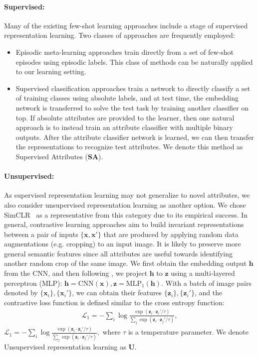 \paragraph{Supervised:} Many of the existing few-shot learning approaches
include a stage of supervised representation learning. Two classes of
approaches are frequently employed:
\iflatexml
\begin{itemize}
\else
\begin{itemize}[leftmargin=*]
\fi
\savespacebeforesection
\item Episodic meta-learning approaches train directly from a set of few-shot
episodes using episodic labels. This class of methods can be naturally applied
to our learning setting.
\item Supervised classification approaches train a network to directly classify
a set of training classes using absolute labels, and at test time, the
embedding network is transferred to solve the test task by training another
classifier on top. If absolute attributes are provided to the learner, then one
natural approach is to instead train an attribute classifier with multiple
binary outputs. After the attribute classifier network is learned, we can then
transfer the representations to recognize test attributes. We denote this
method as Supervised Attributes (\textbf{SA}).
\end{itemize}
\savespacebeforesection
\paragraph{Unsupervised:} 
As supervised representation learning may not generalize to novel attributes,
we also consider unsupervised representation learning as another option. We
chose SimCLR~\citep{simclr} as a representative from this category due to its
empirical success. In general, contrastive learning approaches aim to build
invariant representations between a pair of inputs $\{\mathbf{x},
\mathbf{x'}\}$ that are produced by applying random data augmentations (e.g.
cropping) to an input image. It is likely to preserve more general semantic
features since all attributes are useful towards identifying another random
crop of the same image. We first obtain the embedding output $\mathbf{h}$ from
the CNN, and then following \citep{simclr}, we project $\mathbf{h}$ to
$\mathbf{z}$ using a multi-layered perceptron (MLP): $\mathbf{h} =
\mathrm{CNN}(\mathbf{x}), \mathbf{z} =
\mathrm{MLP}_1(\mathbf{h})$. With a batch of image pairs denoted by
$\{\mathbf{x}_i\}, \{ \mathbf{x}_i'\}$, we can obtain their features
$\{\mathbf{z}_i\}, \{ \mathbf{z}_i'\}$, and the contrastive loss function is
defined similar to the cross entropy function:
\ifarxiv
\begin{align}
    \mathcal{L}_1 = -\sum_i \log\frac{\exp(\mathbf{z}_i \cdot \mathbf{z}_i' /
    \tau)}{\sum_j
    \exp(\mathbf{z}_i \cdot \mathbf{z}_j' / \tau)},
\end{align}
\savespaceeqn
\else
$
    \mathcal{L}_1 = -\sum_i \log\frac{\exp(\mathbf{z}_i \cdot \mathbf{z}_i' /
    \tau)}{\sum_j
    \exp(\mathbf{z}_i \cdot \mathbf{z}_j' / \tau)},
$
\fi
where $\tau$ is a temperature parameter. We denote Unsupervised representation
learning as \textbf{U}.


\end{itemize}
